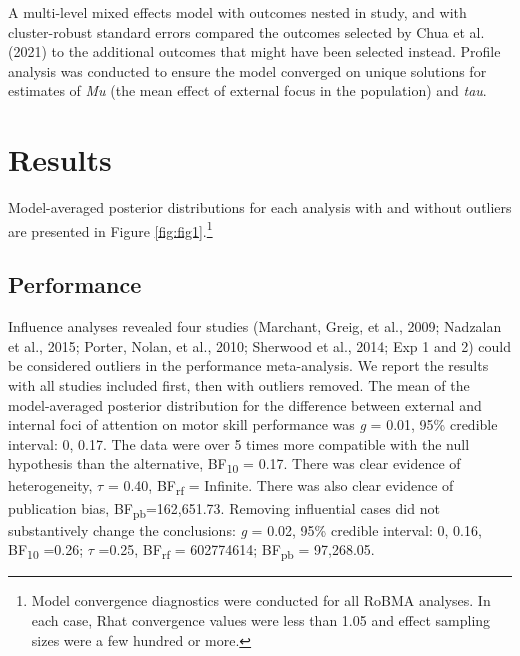 \documentclass[
  man, donotrepeattitle,floatsintext]{apa7}
\begin{document}
A multi-level mixed effects model with outcomes nested in study, and with cluster-robust standard errors compared the outcomes selected by Chua et al. (2021) to the additional outcomes that might have been selected instead. Profile analysis was conducted to ensure the model converged on unique solutions for estimates of \emph{Mu} (the mean effect of external focus in the population) and \emph{tau}.

\hypertarget{results}{%
\section{Results}\label{results}}

Model-averaged posterior distributions for each analysis with and without outliers are presented in Figure \ref{fig:fig1}.\footnote{Model convergence diagnostics were conducted for all RoBMA analyses. In each case, Rhat convergence values were less than 1.05 and effect sampling sizes were a few hundred or more.}

\hypertarget{performance}{%
\subsection{Performance}\label{performance}}

Influence analyses revealed four studies (Marchant, Greig, et al., 2009; Nadzalan et al., 2015; Porter, Nolan, et al., 2010; Sherwood et al., 2014; Exp 1 and 2) could be considered outliers in the performance meta-analysis. We report the results with all studies included first, then with outliers removed. The mean of the model-averaged posterior distribution for the difference between external and internal foci of attention on motor skill performance was \emph{g} = 0.01, 95\% credible interval: 0, 0.17. The data were over 5 times more compatible with the null hypothesis than the alternative, BF\textsubscript{10} = 0.17. There was clear evidence of heterogeneity, \(\tau\) = 0.40, BF\textsubscript{rf} = Infinite. There was also clear evidence of publication bias, BF\textsubscript{pb}=162,651.73. Removing influential cases did not substantively change the conclusions: \emph{g} = 0.02, 95\% credible interval: 0, 0.16, BF\textsubscript{10} =0.26; \(\tau\) =0.25, BF\textsubscript{rf} = 602774614; BF\textsubscript{pb} = 97,268.05.

\clearpage
\end{document}
